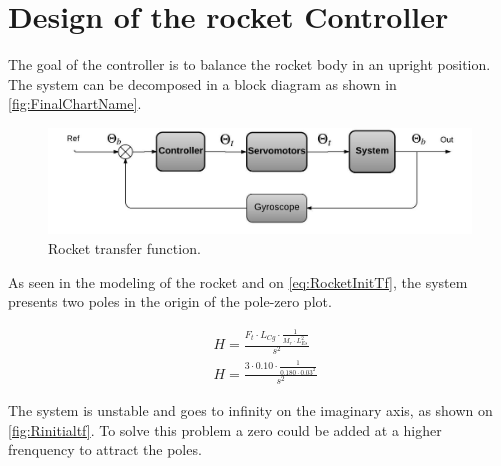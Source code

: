 \graphicspath{{figures/Design/IPController/}}

\chapter{Design of the rocket Controller}\label{sec:IPController}
The goal of the controller is to balance the rocket body in an upright position. The system can be decomposed in a block diagram as shown in \autoref{fig:FinalChartName}.

\begin{figure}[htbp]
	\centering
	
	\includegraphics[width=\textwidth]{figures/Rocket/design/final_chart}
	\caption{Rocket transfer function.}
	\label{fig:FinalChartName}
	
\end{figure}

As seen in the modeling of the rocket and on \autoref{eq:RocketInitTf}, the system presents two poles in the origin of the pole-zero plot. 

\begin{subequations}
	\begin{flalign}
		& H = \frac{F_t \cdot L_{Cg} \cdot \frac{1}{M_r \cdot L_{Es}^2}}{s^2}	\label{eq:RocketInitTf} \\
		& H = \frac{3 \cdot 0.10 \cdot \frac{1}{0.180 \cdot 0.03^2}}{s^2}
	\end{flalign}
\end{subequations}
\startexplain
{}
\stopexplain

The system is unstable and goes to infinity on the imaginary axis, as shown on \autoref{fig:Rinitialtf}. To solve this problem a zero could be added at a higher frenquency to attract the poles.

